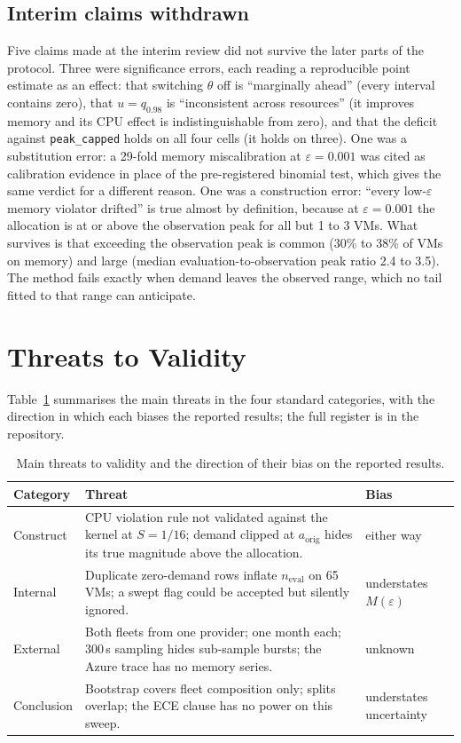 \documentclass[conference]{IEEEtran}
\newcommand{\Meps}{$M(\varepsilon)$}
\begin{document}
\subsection{Interim claims withdrawn}
Five claims made at the interim review did not survive the later parts of the protocol. Three were significance errors, each reading a reproducible point estimate as an effect: that switching $\theta$ off is ``marginally ahead'' (every interval contains zero), that $u=q_{0.98}$ is ``inconsistent across resources'' (it improves memory and its CPU effect is indistinguishable from zero), and that the deficit against \texttt{peak\_capped} holds on all four cells (it holds on three). One was a substitution error: a 29-fold memory miscalibration at $\varepsilon=0.001$ was cited as calibration evidence in place of the pre-registered binomial test, which gives the same verdict for a different reason. One was a construction error: ``every low-$\varepsilon$ memory violator drifted'' is true almost by definition, because at $\varepsilon=0.001$ the allocation is at or above the observation peak for all but 1 to 3 VMs. What survives is that exceeding the observation peak is common (30\% to 38\% of VMs on memory) and large (median evaluation-to-observation peak ratio 2.4 to 3.5). The method fails exactly when demand leaves the observed range, which no tail fitted to that range can anticipate.

\section{Threats to Validity}
\label{sec:threats}
Table~\ref{tab:threats} summarises the main threats in the four standard categories, with the direction in which each biases the reported results; the full register is in the repository.

\begin{table}[t]
\caption{Main threats to validity and the direction of their bias on the reported results.}
\label{tab:threats}
\centering
\footnotesize
\begin{tabular}{@{}p{1.25cm} p{4.6cm} p{1.5cm}@{}}
\toprule
Category & Threat & Bias \\
\midrule
Construct & CPU violation rule not validated against the kernel at $S=1/16$; demand clipped at $a_{\mathrm{orig}}$ hides its true magnitude above the allocation. & either way \\
Internal & Duplicate zero-demand rows inflate $n_{\mathrm{eval}}$ on 65 VMs; a swept flag could be accepted but silently ignored. & understates \Meps{} \\
External & Both fleets from one provider; one month each; 300\,s sampling hides sub-sample bursts; the Azure trace has no memory series. & unknown \\
Conclusion & Bootstrap covers fleet composition only; splits overlap; the ECE clause has no power on this sweep. & understates uncertainty \\
\bottomrule
\end{tabular}
\end{table}
\end{document}
